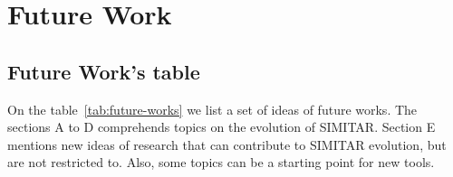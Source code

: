 \chapter{Future Work}\label{ch:future-work}

\section{Future Work's table}

On the table~\ref{tab:future-works} we list a set of ideas of future works. The sections A to D comprehends topics on the evolution of SIMITAR. Section E mentions new ideas of research that can contribute to SIMITAR evolution, but are not restricted to. Also, some topics can be a starting point for new tools.


